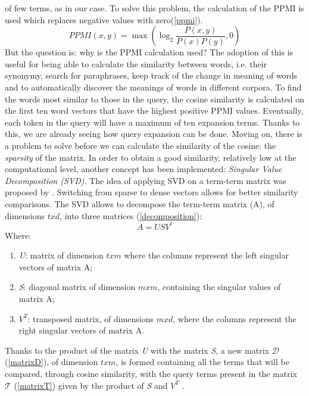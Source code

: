 of few terms, as in our case. To solve this problem, the calculation of the 
PPMI is used which replaces negative values with zero(\ref{ppmi}).
\begin{equation}\label{ppmi}
    PPMI(x,y) = \max(\log_2\frac{P(x,y)}{P(x)P(y)}, 0)
\end{equation}
But the question is: why is the PPMI calculation used? The adoption of 
this is useful for being able to calculate the similarity between words, i.e. 
their synonymy, search for paraphrases, keep track of the change in meaning 
of words and to automatically discover the meanings of words in different 
corpora. To find the words most similar to those in the query, the cosine 
similarity is calculated on the first ten word vectors that have the highest 
positive PPMI values. Eventually, each token in the query will have a maximum 
of ten expansion terms. Thanks to this, we are already seeing how 
query expansion can be done. Moving on, there is a problem to solve before we can 
calculate the similarity of the cosine: the \emph{sparsity} of the matrix. In order to 
obtain a good similarity, relatively low at the computational level, another 
concept has been implemented: \emph{Singular Value Decomposition (SVD)}. The 
idea of applying SVD on a term-term matrix was proposed by \cite{13}. Switching 
from sparse to dense vectors allows for better similarity comparisons. The 
SVD allows to decompose the term-term matrix (A), of dimensions $txd$, into 
three matrices \cite{14} (\ref{decomposition}):
\begin{equation}\label{decomposition}
    A = USV^t
\end{equation}
Where:
\begin{enumerate}
    \item \emph{U}: matrix of dimension $txm$ where the columns represent the left 
    singular vectors of matrix A;
    \item \emph{S}: diagonal matrix of dimension $mxm$, containing the singular values 
    of matrix A;
    \item \emph{$V^T$}: transposed matrix, of dimensions $mxd$, where the columns represent 
    the right singular vectors of matrix A.
\end{enumerate}
Thanks to the product of the matrix \emph{U} with the matrix \emph{S}, a new matrix 
\emph{$\mathcal{D}$} (\ref{matrixD}), of dimension $txm$, is formed containing all the terms that will be 
compared, through cosine similarity, with the query terms present in the 
matrix \emph{$\mathcal{T}$} (\ref{matrixT}) given by the product of \emph{S} and $V^T$ .
